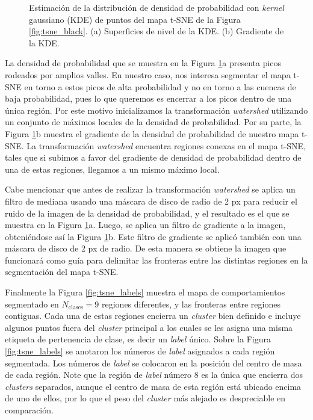 \begin{figure}[!htbp]
\begin{subfigure}{.49\textwidth}
        \caption{}
    \end{subfigure}
    \caption{ Estimación de la distribución de densidad de probabilidad con \textit{kernel} gaussiano (KDE) de puntos del mapa t-SNE de la Figura \ref{fig:tsne_black}. (a) Superficies de nivel de la KDE. (b) Gradiente de la KDE.}
    \label{fig:tsne_pdf}
\end{figure}

La densidad de probabilidad que se muestra en la Figura \ref{fig:tsne_pdf}a presenta picos rodeados por amplios valles. En nuestro caso, nos interesa segmentar el mapa t-SNE en torno a estos picos de alta probabilidad y no en torno a las cuencas de baja probabilidad, pues lo que queremos es encerrar a los picos dentro de una única región. Por este motivo inicializamos la transformación \textit{watershed} utilizando un conjunto de máximos locales de la densidad de probabilidad. Por su parte, la Figura \ref{fig:tsne_pdf}b muestra el gradiente de la densidad de probabilidad de nuestro mapa t-SNE. La transformación \textit{watershed} encuentra regiones conexas en el mapa t-SNE, tales que si subimos a favor del gradiente de densidad de probabilidad dentro de una de estas regiones, llegamos a un mismo máximo local.

Cabe mencionar que antes de realizar la transformación \textit{watershed} se aplica un filtro de mediana usando una máscara de disco de radio de 2 px para reducir el ruido de la imagen de la densidad de probabilidad, y el resultado es el que se muestra en la Figura \ref{fig:tsne_pdf}a. Luego, se aplica un filtro de gradiente a la imagen, obteniéndose así la Figura \ref{fig:tsne_pdf}b. Este filtro de gradiente se aplicó también con una máscara de disco de 2 px de radio. De esta manera se obtiene la imagen que funcionará como guía para delimitar las fronteras entre las distintas regiones en la segmentación del mapa t-SNE.

Finalmente la Figura \ref{fig:tsne_labels} muestra el mapa de comportamientos segmentado en $N_{\mathrm{clases}} = 9$ regiones diferentes, y las fronteras entre regiones contiguas. Cada una de estas regiones encierra un \textit{cluster} bien definido e incluye algunos puntos fuera del \textit{cluster} principal a los cuales se les asigna una misma etiqueta de pertenencia de clase, es decir un \textit{label} único. Sobre la Figura \ref{fig:tsne_labels} se anotaron los números de \textit{label} asignados a cada región segmentada. Los números de \textit{label} se colocaron en la posición del centro de masa de cada región. Note que la región de \textit{label} número 8 es la única que encierra dos \textit{clusters} separados, aunque el centro de masa de esta región está ubicado encima de uno de ellos, por lo que el peso del \textit{cluster} más alejado es despreciable en comparación.

